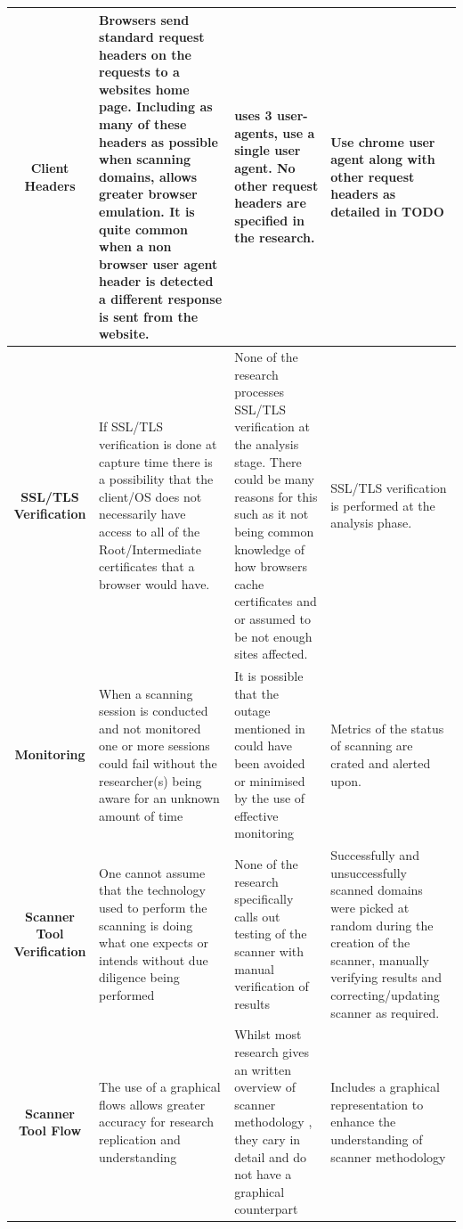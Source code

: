 \documentclass{mscreport}
\begin{document}
\begin{center}
\begin{longtable}{|C|E|H|H|}
      \hline
      \textbf{Client Headers} & Browsers send standard request headers on the requests to a websites home page. Including as many of these headers as possible when scanning domains, allows greater browser emulation. It is quite common when a non browser user agent header is detected a different response is sent from the website. & \cite{Patil2017-bg} uses 3 user-agents, \cite{Buchanan2018-xz,Amann2017-co,Kotzias2018-wd,Poteat2021-zr,Van_Goethem2014-ao,Chen2016-dl,Kumar2017-qw,Michael2015-hn} use a single user agent. No other request headers are specified in the research. & Use chrome user agent along with other request headers as detailed in TODO \\
      \hline
      \textbf{SSL/TLS Verification} & If SSL/TLS verification is done at capture time there is a possibility that the client/OS does not necessarily have access to all of the Root/Intermediate certificates that a browser would have. & None of the research \cite{Patil2017-bg,Buchanan2018-xz,Amann2017-co,Kotzias2018-wd,Poteat2021-zr,Roth2020-hg,Van_Goethem2014-ao,Chen2016-dl,Kumar2017-qw,Calzavara2018-xv,Holz2020-ha,Michael2015-hn,} processes SSL/TLS verification at the analysis stage. There could be many reasons for this such as it not being common knowledge of how browsers cache certificates and or assumed to be not enough sites affected. & SSL/TLS verification is performed at the analysis phase. \\
      \hline
      \textbf{Monitoring} & When a scanning session is conducted and not monitored one or more sessions could fail without the researcher(s) being aware for an unknown amount of time & It is possible that the outage mentioned in \cite{Poteat2021-zr} could have been avoided or minimised by the use of effective monitoring & Metrics of the status of scanning are crated and alerted upon. \\
      \hline
      \textbf{Scanner Tool Verification} & One cannot assume that the technology used to perform the scanning is doing what one expects or intends without due diligence being performed & None of the research specifically calls out testing of the scanner with manual verification of results & Successfully and unsuccessfully scanned domains were picked at random during the creation of the scanner, manually verifying results and correcting/updating scanner as required. \\
      \hline
      \textbf{Scanner Tool Flow} & The use of a graphical flows allows greater accuracy for research replication and understanding & Whilst most research gives an written overview of scanner methodology \cite{Buchanan2018-xz,Amann2017-co,Patil2017-bg,Kotzias2018-wd,Poteat2021-zr,Van_Goethem2014-ao,Chen2016-dl,Kumar2017-qw,Holz2020-ha,Michael2015-hn}, they cary in detail and do not have a graphical counterpart & Includes a graphical representation to enhance the understanding of scanner methodology \\
\end{longtable}
\end{center}
\end{document}
